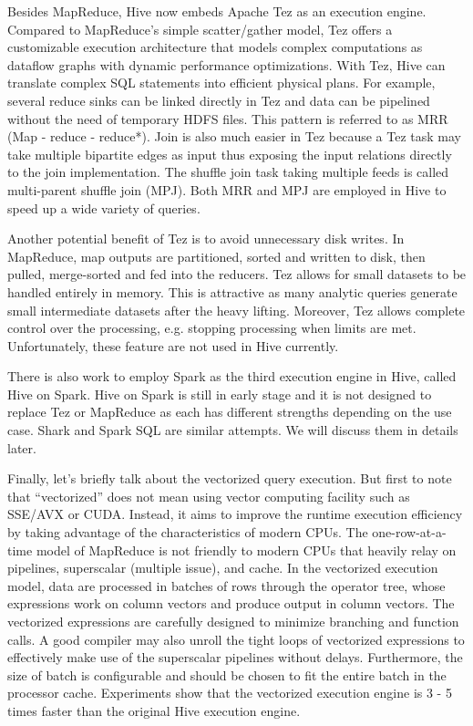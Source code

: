 \documentclass[12pt]{book}
\begin{document}
Besides MapReduce, Hive now embeds Apache Tez as an execution engine. Compared to MapReduce's simple scatter/gather model, Tez offers a customizable execution architecture that models complex computations as dataflow graphs with dynamic performance optimizations. With Tez, Hive can translate complex SQL statements into efficient physical plans. For example, several reduce sinks can be linked directly in Tez and data can be pipelined without the need of temporary HDFS files. This pattern is referred to as MRR (Map - reduce - reduce*). Join is also much easier in Tez because a Tez task may take multiple bipartite edges as input thus exposing the input relations directly to the join implementation. The shuffle join task taking multiple feeds is called multi-parent shuffle join (MPJ). Both MRR and MPJ are employed in Hive to speed up a wide variety of queries.

Another potential benefit of Tez is to avoid unnecessary disk writes. In MapReduce, map outputs are partitioned, sorted and written to disk, then pulled, merge-sorted and fed into the reducers. Tez allows for small datasets to be handled entirely in memory. This is attractive as many analytic queries generate small intermediate datasets after the heavy lifting. Moreover, Tez allows complete control over the processing, e.g. stopping processing when limits are met. Unfortunately, these feature are not used in Hive currently.

There is also work to employ Spark as the third execution engine in Hive, called Hive on Spark. Hive on Spark is still in early stage and it is not designed to replace Tez or MapReduce as each has different strengths depending on the use case. Shark and Spark SQL are similar attempts. We will discuss them in details later.

Finally, let's briefly talk about the vectorized query execution. But first to note that ``vectorized'' does not mean using vector computing facility such as SSE/AVX or CUDA. Instead, it aims to improve the runtime execution efficiency by taking advantage of the characteristics of modern CPUs. The one-row-at-a-time model of MapReduce is not friendly to modern CPUs that heavily relay on pipelines, superscalar (multiple issue), and cache. In the vectorized execution model, data are processed in batches of rows through the operator tree, whose expressions work on column vectors and produce output in column vectors. The vectorized expressions are carefully designed to minimize branching and function calls. A good compiler may also unroll the tight loops of vectorized expressions to effectively make use of the superscalar pipelines without delays. Furthermore, the size of batch is configurable and should be chosen to fit the entire batch in the processor cache. Experiments show that the vectorized execution engine is 3 - 5 times faster than the original Hive execution engine.
\end{document}
